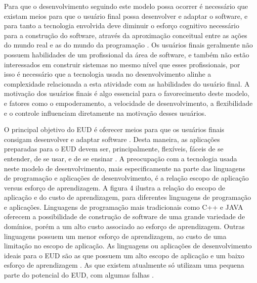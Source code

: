 Para que o desenvolvimento seguindo este modelo possa ocorrer é necessário que existam meios para que o usuário final possa desenvolver e adaptar o software, e para tanto a tecnologia envolvida deve diminuir o esforço cognitivo necessário para a construção do software, através da aproximação conceitual entre as ações do mundo real e as do mundo da programação \cite{fischer2004}. Os usuários finais geralmente não possuem habilidades de um profissional da área de software, e também não estão interessados em construir sistemas no mesmo nível que esses profissionais, por isso é necessário que a tecnologia usada no desenvolvimento alinhe a complexidade relacionada a esta atividade com as habilidades do usuário final. A motivação dos usuários finais é algo essencial para o favorecimento deste modelo, e fatores como o empoderamento, a velocidade de desenvolvimento, a flexibilidade e o controle influenciam diretamente na motivação desses usuários.

O principal objetivo do EUD é oferecer meios para que os usuários finais consigam desenvolver e adaptar software \cite{lieberman2006}. Desta maneira, as aplicações preparadas para o EUD devem ser, principalmente, flexíveis, fáceis de se entender, de se usar, e de se ensinar \cite{lieberman2006}. A preocupação com a tecnologia usada neste modelo de desenvolvimento, mais especificamente na parte das linguagens de programação e aplicações de desenvolvimento, é a relação escopo de aplicação versus esforço de aprendizagem. A figura 4 ilustra a relação do escopo de aplicação e do custo de aprendizagem, para diferentes linguagens de programação e aplicações. Linguagens de programação mais tradicionais como C++ e JAVA oferecem a possibilidade de construção de software de uma grande variedade de domínios, porém a um alto custo associado ao esforço de aprendizagem. Outras linguagens possuem um menor esforço de aprendizagem, ao custo de uma limitação no escopo de aplicação. As linguagens ou aplicações de desenvolvimento ideais para o EUD são as que possuem um alto escopo de aplicação e um baixo esforço de aprendizagem \cite{fischer2004}. As que existem atualmente só utilizam uma pequena parte do potencial do EUD, com algumas falhas \cite{paterno2013}.


